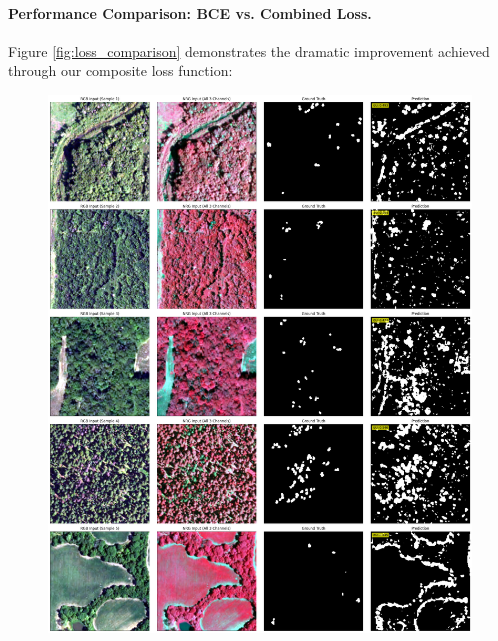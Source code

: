\paragraph{Performance Comparison: BCE vs. Combined Loss.}
Figure \ref{fig:loss_comparison} demonstrates the dramatic improvement achieved through our composite loss function:

\begin{figure}[htbp]
  \centering
  \begin{minipage}{0.47\linewidth}
    \centering
    \includegraphics[width=0.9\linewidth]{figs/unet-bad-result-grid.jpg}
    \label{fig:bad}
  \end{minipage}\hfill
  \begin{minipage}{0.47\linewidth}
    \centering

\end{minipage}
\end{figure}
